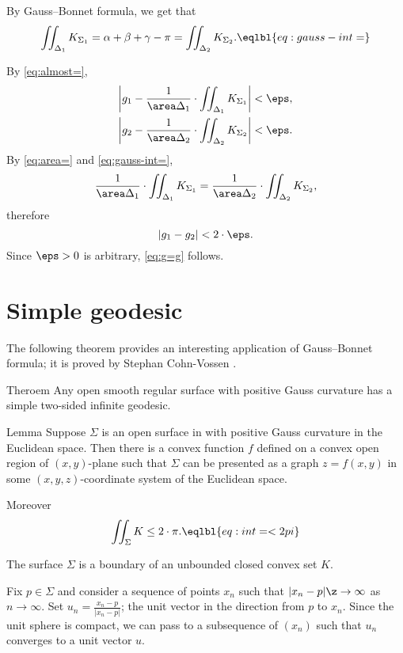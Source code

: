 By Gauss--Bonnet formula, we get that 
\[\iint_{\Delta_1}K_{\Sigma_1}=\alpha+\beta+\gamma-\pi=\iint_{\Delta_2}K_{\Sigma_2}.
\eqlbl{eq:gauss-int=}\]

By \ref{eq:almost=}, 
\begin{align*}
\left|g_1-\frac1{\area\Delta_1}\cdot\iint_{\Delta_1}K_{\Sigma_1}\right|&<\eps,
\\
\left|g_2-\frac1{\area\Delta_2}\cdot\iint_{\Delta_2}K_{\Sigma_2}\right|&<\eps.
\end{align*}
By \ref{eq:area=} and \ref{eq:gauss-int=},
\[\frac1{\area\Delta_1}\cdot\iint_{\Delta_1}K_{\Sigma_1}
=
\frac1{\area\Delta_2}\cdot\iint_{\Delta_2}K_{\Sigma_2},\]
therefore
\[|g_1-g_2|<2\cdot\eps.\]
Since $\eps>0$ is arbitrary, \ref{eq:g=g} follows.
\qeds


\section{Simple geodesic}

The following theorem provides an interesting application of Gauss--Bonnet formula;
it is proved by Stephan Cohn-Vossen \cite[Satz 9 in][]{convossen}.


\begin{thm}{Theroem}\label{thm:cohn-vossen}
Any open smooth regular surface with positive Gauss curvature has a simple two-sided infinite geodesic.
\end{thm}

\begin{thm}{Lemma}\label{lem:graph}
Suppose $\Sigma$ is an open surface in with positive Gauss curvature in the Euclidean space.
Then there is a convex function $f$ defined on a convex open region of $(x,y)$-plane 
such that $\Sigma$ can be presented as a graph $z=f(x,y)$ in some $(x,y,z)$-coordinate system of the Euclidean space.

Moreover 
\[\iint_\Sigma K\le 2\cdot\pi.\eqlbl{eq:int=<2pi}\]

\end{thm}

The surface $\Sigma$ is a boundary of an unbounded closed convex set $K$.

Fix $p\in \Sigma$ and consider a sequence of points $x_n$ such that $|x_n-p|\z\to \infty$ as $n\to \infty$.
Set $u_n=\tfrac{x_n-p}{|x_n-p|}$; the unit vector in the direction from $p$ to $x_n$.
Since the unit sphere is compact, we can pass to a subsequence of $(x_n)$ such that $u_n$ converges to a unit vector $u$.

